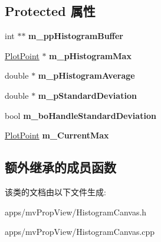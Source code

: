 \subsection*{Protected 属性}
\begin{DoxyCompactItemize}
\item 
\hypertarget{class_histogram_canvas_a75ef2d53bb9794463d3265b31cbd7c85}{int $\ast$$\ast$ {\bfseries m\+\_\+pp\+Histogram\+Buffer}}\label{class_histogram_canvas_a75ef2d53bb9794463d3265b31cbd7c85}

\item 
\hypertarget{class_histogram_canvas_a5935bffd3f4f4cb36f57508543b3a77b}{\hyperlink{struct_plot_point}{Plot\+Point} $\ast$ {\bfseries m\+\_\+p\+Histogram\+Max}}\label{class_histogram_canvas_a5935bffd3f4f4cb36f57508543b3a77b}

\item 
\hypertarget{class_histogram_canvas_a0ffed731172fe431255af532d390ab52}{double $\ast$ {\bfseries m\+\_\+p\+Histogram\+Average}}\label{class_histogram_canvas_a0ffed731172fe431255af532d390ab52}

\item 
\hypertarget{class_histogram_canvas_a69573a27f0ca4fee1dbad0fd2d931d40}{double $\ast$ {\bfseries m\+\_\+p\+Standard\+Deviation}}\label{class_histogram_canvas_a69573a27f0ca4fee1dbad0fd2d931d40}

\item 
\hypertarget{class_histogram_canvas_a4c85d7e883880a564ccb8b525859f501}{bool {\bfseries m\+\_\+bo\+Handle\+Standard\+Deviation}}\label{class_histogram_canvas_a4c85d7e883880a564ccb8b525859f501}

\item 
\hypertarget{class_histogram_canvas_abc4ed6de80f23401020f5ea48ce1cb65}{\hyperlink{struct_plot_point}{Plot\+Point} {\bfseries m\+\_\+\+Current\+Max}}\label{class_histogram_canvas_abc4ed6de80f23401020f5ea48ce1cb65}

\end{DoxyCompactItemize}
\subsection*{额外继承的成员函数}


该类的文档由以下文件生成\+:\begin{DoxyCompactItemize}
\item 
apps/mv\+Prop\+View/Histogram\+Canvas.\+h\item 
apps/mv\+Prop\+View/Histogram\+Canvas.\+cpp\end{DoxyCompactItemize}
